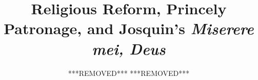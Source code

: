 
    \author{***REMOVED*** ***REMOVED***} %
    \newcommand{\authormail}{} %
    \newcommand{\matrikelnr}{} %
    \newcommand{\authoraddress}{} %
    
    \newcommand{\city}{} %
    \newcommand{\university}{} %
    \newcommand{\faculty}{} %
    \newcommand{\department}{} %
    \newcommand{\handindate}{} %
    
    \newcommand{\tutor}{} %
    \newcommand{\coursetype}{} %
    \newcommand{\coursetitle}{} %
    \newcommand{\coursenumber}{} %
    
    \title{
        Religious Reform, Princely Patronage, and Josquin's \emph{Miserere mei, Deus}} %
    \date{}
    \newcommand{\papertype}{} %
    \newcommand{\keywords}{} %
    
    \newcommand{\mainlanguage}{UKenglish} 
    \usepackage[ngerman, \mainlanguage]{babel}
%
%
\usepackage[babel]{csquotes}

